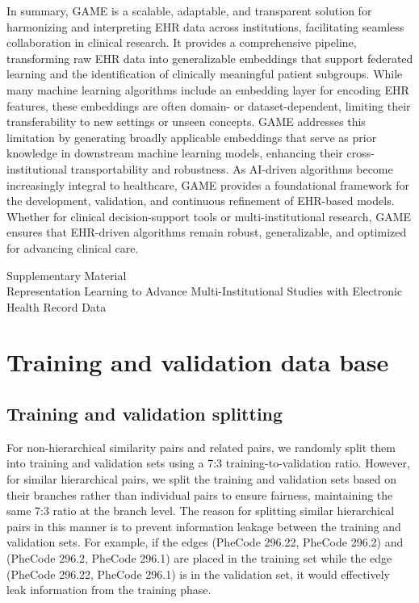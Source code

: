 \documentclass{article}
\begin{document}
In summary, GAME is a scalable, adaptable, and transparent solution for harmonizing and interpreting EHR data across institutions, facilitating seamless collaboration in clinical research. It provides a comprehensive pipeline, transforming raw EHR data into generalizable embeddings that support federated learning and the identification of clinically meaningful patient subgroups. While many machine learning algorithms include an embedding layer for encoding EHR features, these embeddings are often domain- or dataset-dependent, limiting their transferability to new settings or unseen concepts. GAME addresses this limitation by generating broadly applicable embeddings that serve as prior knowledge in downstream machine learning models, enhancing their cross-institutional transportability and robustness. As AI-driven algorithms become increasingly integral to healthcare, GAME provides a foundational framework for the development, validation, and continuous refinement of EHR-based models. Whether for clinical decision-support tools or multi-institutional research, GAME ensures that EHR-driven algorithms remain robust, generalizable, and optimized for advancing clinical care.






\appendix
\clearpage
\begin{center}
    {\LARGE Supplementary Material} \\[10pt]
    {\Large Representation Learning to Advance Multi-Institutional Studies with Electronic Health Record Data}
\end{center}
\bigskip



\renewcommand{\thefigure}{S\arabic{figure}} %
\renewcommand{\thetable}{S\arabic{table}}   %
\setcounter{figure}{0} %
\setcounter{table}{0}  %
\renewcommand{\thesection}{S.\arabic{section}}
\section{Training and validation data base}
\subsection{Training and validation splitting}
\label{supp:split}
For non-hierarchical similarity pairs and related pairs, we randomly split them into training and validation sets using a 7:3 training-to-validation ratio. However, for similar hierarchical pairs, we split the training and validation sets based on their branches rather than individual pairs to ensure fairness, maintaining the same 7:3 ratio at the branch level. The reason for splitting similar hierarchical pairs in this manner is to prevent information leakage between the training and validation sets. For example, if the edges (PheCode 296.22, PheCode 296.2) and (PheCode 296.2, PheCode 296.1) are placed in the training set while the edge (PheCode 296.22, PheCode 296.1) is in the validation set, it would effectively leak information from the training phase. 
\end{document}
